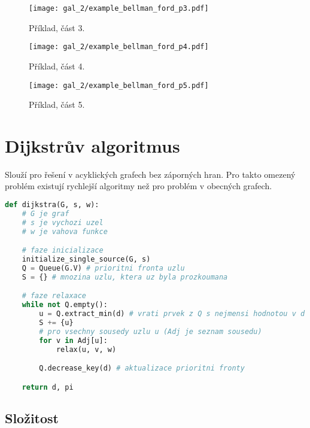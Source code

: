 \begin{figure}[H]
    \centering
    \texttt{[image: gal\_2/example\_bellman\_ford\_p3.pdf]}
    \caption{Příklad, část 3.}
\end{figure}

\begin{figure}[H]
    \centering
    \texttt{[image: gal\_2/example\_bellman\_ford\_p4.pdf]}
    \caption{Příklad, část 4.}
\end{figure}

\begin{figure}[H]
    \centering
    \texttt{[image: gal\_2/example\_bellman\_ford\_p5.pdf]}
    \caption{Příklad, část 5.}
\end{figure}


\section{Dijkstrův algoritmus}

Slouží pro řešení v acyklických grafech bez záporných hran. Pro takto omezený problém existují rychlejší algoritmy než pro problém v obecných grafech.

\bigskip\noindent\begin{minipage}{\linewidth}
\begin{lstlisting}[language=Python, caption={Algoritmus Dijkstra.}]
def dijkstra(G, s, w):
    # G je graf
    # s je vychozi uzel
    # w je vahova funkce

    # faze inicializace
    initialize_single_source(G, s)
    Q = Queue(G.V) # prioritni fronta uzlu
    S = {} # mnozina uzlu, ktera uz byla prozkoumana

    # faze relaxace
    while not Q.empty():
        u = Q.extract_min(d) # vrati prvek z Q s nejmensi hodnotou v d
        S += {u}
        # pro vsechny sousedy uzlu u (Adj je seznam sousedu)
        for v in Adj[u]:
            relax(u, v, w)

        Q.decrease_key(d) # aktualizace prioritni fronty

    return d, pi
\end{lstlisting}
\end{minipage}

\subsection*{Složitost}

